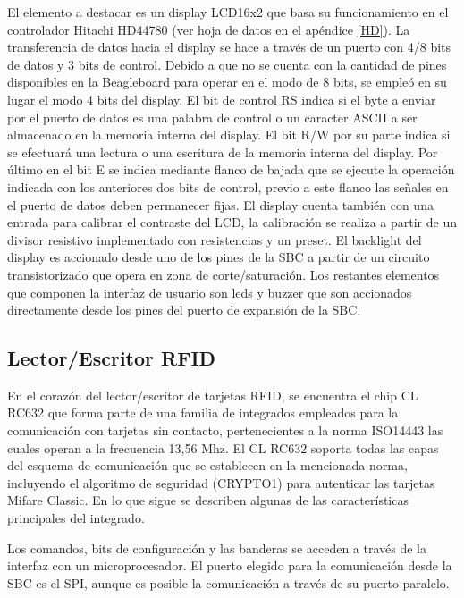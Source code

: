 \bigskip
\bigskip
{}

El elemento a destacar es un display LCD16x2 que basa su funcionamiento en el controlador Hitachi HD44780 \cite{dpy} (ver hoja de datos en el apéndice \ref{HD}). La transferencia de datos hacia el display se hace a través de un puerto con 4/8 bits de datos y 3 bits de control. Debido a que no se cuenta con la cantidad de pines disponibles en la Beagleboard para operar en el modo de 8 bits, se empleó en su lugar el modo 4 bits del display. El bit de control RS indica si el byte a enviar por el puerto de datos es una palabra de control o un caracter ASCII a ser almacenado en la memoria interna del display. El bit R/W por su parte indica si se efectuará una lectura o una escritura de la memoria interna del display. Por último en el bit E se indica mediante flanco de bajada que se ejecute la operación indicada con los anteriores dos bits de control, previo a este flanco las señales en el puerto de datos deben permanecer fijas.
El display cuenta también con una entrada para calibrar el contraste del LCD, la calibración se realiza a partir de un divisor resistivo implementado con resistencias y un preset.
El backlight del display es accionado desde uno de los pines de la SBC a partir de un circuito transistorizado que opera en zona de corte/saturación.
Los restantes elementos que componen la interfaz de usuario son leds y buzzer que son accionados directamente desde los pines del puerto de expansión de la SBC.

\subsection{Lector/Escritor RFID}
En el corazón del lector/escritor de tarjetas RFID, se encuentra el chip CL RC632 que forma parte de una familia de integrados empleados para la comunicación con tarjetas sin contacto, pertenecientes a la norma ISO14443 las cuales operan a la frecuencia 13,56 Mhz.
El CL RC632 soporta todas las capas del esquema de comunicación que se establecen en la mencionada norma, incluyendo el algoritmo de seguridad (CRYPTO1) para autenticar las tarjetas Mifare Classic. En lo que sigue se describen algunas de las características principales del integrado.

\bigskip
{}

Los comandos, bits de configuración y las banderas se acceden a través de la interfaz con un microprocesador. El puerto elegido para la comunicación desde la SBC es el SPI, aunque es posible la comunicación a través de su puerto paralelo. 

